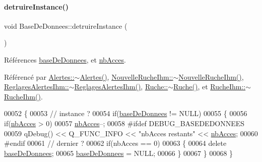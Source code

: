 \paragraph{\texorpdfstring{detruire\+Instance()}{detruireInstance()}}
{\footnotesize\ttfamily void Base\+De\+Donnees\+::detruire\+Instance (\begin{DoxyParamCaption}{ }\end{DoxyParamCaption})\hspace{0.3cm}{\ttfamily [static]}}



Références \hyperlink{class_base_de_donnees_a822ba0b7cf85b1e48ced8efd3d65e266}{base\+De\+Donnees}, et \hyperlink{class_base_de_donnees_a5099ecb2922bb31d84cd5d4505298a29}{nb\+Acces}.



Référencé par \hyperlink{class_alertes_a730b10861d04de9944b30b11c6b3c3af}{Alertes\+::$\sim$\+Alertes()}, \hyperlink{class_nouvelle_ruche_ihm_a17e5dfd1146574134eaa3ab8eae4f6d4}{Nouvelle\+Ruche\+Ihm\+::$\sim$\+Nouvelle\+Ruche\+Ihm()}, \hyperlink{class_reglages_alertes_ihm_aa9bfc09b4162f536de84d218daa36982}{Reglages\+Alertes\+Ihm\+::$\sim$\+Reglages\+Alertes\+Ihm()}, \hyperlink{class_ruche_ad3f950d0731f9801f06dd6ae09f2e5fa}{Ruche\+::$\sim$\+Ruche()}, et \hyperlink{class_ruche_ihm_a4c489bf18e8c9947a375322d03504419}{Ruche\+Ihm\+::$\sim$\+Ruche\+Ihm()}.


\begin{DoxyCode}
00052 \{
00053     \textcolor{comment}{// instance ?}
00054     \textcolor{keywordflow}{if}(\hyperlink{class_base_de_donnees_a822ba0b7cf85b1e48ced8efd3d65e266}{baseDeDonnees} != NULL)
00055     \{
00056         \textcolor{keywordflow}{if}(\hyperlink{class_base_de_donnees_a5099ecb2922bb31d84cd5d4505298a29}{nbAcces} > 0)
00057             \hyperlink{class_base_de_donnees_a5099ecb2922bb31d84cd5d4505298a29}{nbAcces}--;
00058 \textcolor{preprocessor}{        #ifdef DEBUG\_BASEDEDONNEES}
00059         qDebug() << Q\_FUNC\_INFO << \textcolor{stringliteral}{"nbAcces restants"} << \hyperlink{class_base_de_donnees_a5099ecb2922bb31d84cd5d4505298a29}{nbAcces};
00060 \textcolor{preprocessor}{        #endif}
00061         \textcolor{comment}{// dernier ?}
00062         \textcolor{keywordflow}{if}(nbAcces == 0)
00063         \{
00064             \textcolor{keyword}{delete} \hyperlink{class_base_de_donnees_a822ba0b7cf85b1e48ced8efd3d65e266}{baseDeDonnees};
00065             \hyperlink{class_base_de_donnees_a822ba0b7cf85b1e48ced8efd3d65e266}{baseDeDonnees} = NULL;
00066         \}
00067     \}
00068 \}
\end{DoxyCode}
\mbox{\label{class_base_de_donnees_a00388973f3ec42e5c8e76e7af7e124b2}} 
